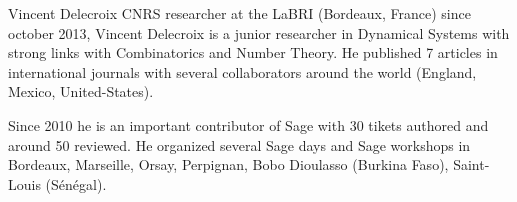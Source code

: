 \begin{participant}[type=leadPI,PM=12,salary=4700,gender=male]{Vincent Delecroix}
CNRS researcher at the LaBRI (Bordeaux, France) since october 2013, Vincent
Delecroix is a junior researcher in Dynamical Systems with strong links with
Combinatorics and Number Theory. He published 7 articles in international
journals with several collaborators around the world (England, Mexico,
United-States).

Since 2010 he is an important contributor of Sage with 30 tikets authored and
around 50 reviewed. He organized several Sage days and Sage workshops in
Bordeaux, Marseille, Orsay, Perpignan, Bobo Dioulasso (Burkina Faso),
Saint-Louis (S\'en\'egal).
\end{participant}

